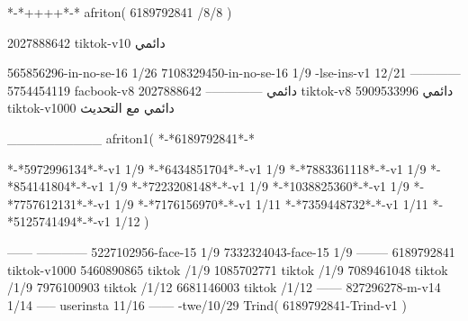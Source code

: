 *-*++++*-*
afriton(
6189792841 /8/8
)

2027888642 tiktok-v10
دائمي

565856296-in-no-se-16 1/26
7108329450-in-no-se-16 1/9
-lse-ins-v1 12/21
------------
5754454119 facbook-v8
دائمي
--------------
2027888642 tiktok-v8
دائمي
5909533996 tiktok-v1000
دائمي مع التحديث

__________
afriton1(
*-*6189792841*-*

*-*5972996134*-*-v1 1/9
*-*6434851704*-*-v1 1/9
*-*7883361118*-*-v1 1/9
*-*854141804*-*-v1 1/9
*-*7223208148*-*-v1 1/9
*-*1038825360*-*-v1 1/9
*-*7757612131*-*-v1 1/9
*-*7176156970*-*-v1 1/11
*-*7359448732*-*-v1 1/11
*-*5125741494*-*-v1 1/12
)

------
------------
5227102956-face-15 1/9
7332324043-face-15 1/9
--------
6189792841 tiktok-v1000
5460890865 tiktok /1/9
1085702771 tiktok /1/9
7089461048 tiktok /1/9
7976100903 tiktok /1/12
6681146003 tiktok /1/12
------
827296278-m-v14 1/14
-----
userinsta 11/16
------
-twe/10/29
Trind(
6189792841-Trind-v1 
)
